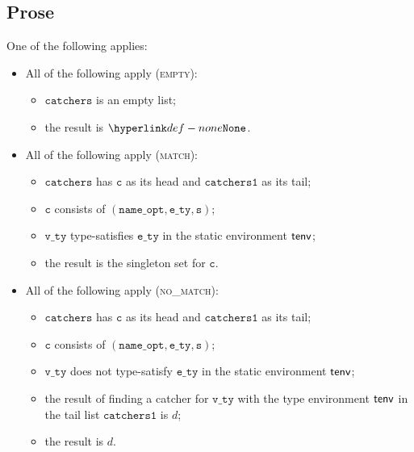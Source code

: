 \documentclass{book}
\newcommand\vc[0]{\texttt{c}}
\newcommand\vs[0]{\texttt{s}}
\newcommand\catchers[0]{\texttt{catchers}}
\newcommand\catchersone[0]{\texttt{catchers1}}
\newcommand\ety[0]{\texttt{e\_ty}}
\newcommand\vvty[0]{\texttt{v\_ty}}
\newcommand\nameopt[0]{\texttt{name\_opt}}
\begin{document}
\subsection{Prose}
One of the following applies:
\begin{itemize}
  \item All of the following apply (\textsc{empty}):
  \begin{itemize}
    \item $\catchers$ is an empty list;
    \item the result is $\None$.
  \end{itemize}

  \item All of the following apply (\textsc{match}):
  \begin{itemize}
    \item $\catchers$ has $\vc$ as its head and $\catchersone$ as its tail;
    \item $\vc$ consists of $(\nameopt, \ety, \vs)$;
    \item $\vvty$ type-satisfies $\ety$ in the static environment $\textsf{tenv}$;
    \item the result is the singleton set for $\vc$.
  \end{itemize}

  \item All of the following apply (\textsc{no\_match}):
  \begin{itemize}
    \item $\catchers$ has $\vc$ as its head and $\catchersone$ as its tail;
    \item $\vc$ consists of $(\nameopt, \ety, \vs)$;
    \item $\vvty$ does not type-satisfy $\ety$ in the static environment $\textsf{tenv}$;
    \item the result of finding a catcher for $\vvty$ with the type environment $\textsf{tenv}$ in the tail list $\catchersone$
    is $d$;
    \item the result is $d$.
  \end{itemize}
\end{itemize}


\end{document}
